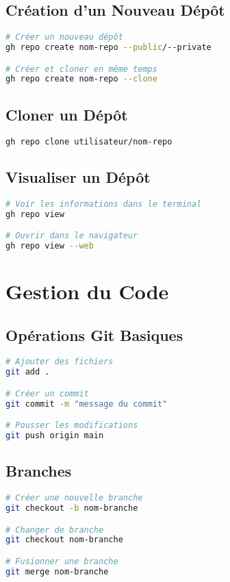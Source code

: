 \documentclass[11pt,a4paper]{article}
\begin{document}
\subsection{Création d'un Nouveau Dépôt}
\begin{lstlisting}[language=bash]
# Créer un nouveau dépôt
gh repo create nom-repo --public/--private

# Créer et cloner en même temps
gh repo create nom-repo --clone
\end{lstlisting}

\subsection{Cloner un Dépôt}
\begin{lstlisting}[language=bash]
gh repo clone utilisateur/nom-repo
\end{lstlisting}

\subsection{Visualiser un Dépôt}
\begin{lstlisting}[language=bash]
# Voir les informations dans le terminal
gh repo view

# Ouvrir dans le navigateur
gh repo view --web
\end{lstlisting}

\section{Gestion du Code}
\subsection{Opérations Git Basiques}
\begin{lstlisting}[language=bash]
# Ajouter des fichiers
git add .

# Créer un commit
git commit -m "message du commit"

# Pousser les modifications
git push origin main
\end{lstlisting}

\subsection{Branches}
\begin{lstlisting}[language=bash]
# Créer une nouvelle branche
git checkout -b nom-branche

# Changer de branche
git checkout nom-branche

# Fusionner une branche
git merge nom-branche
\end{lstlisting}
\end{document}
